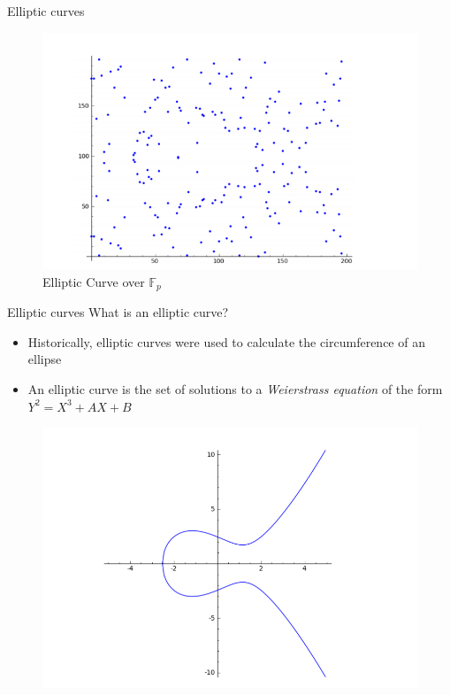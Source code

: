 \documentclass[handout]{beamer}
\begin{document}
\begin{frame}{Elliptic curves}
\begin{figure}
\begin{minipage}{0.48\textwidth}
		\caption{Elliptic Curve over $\mathbb{C}$}\label{fig:elliptic_curve_c}
	\end{minipage}\hfill
	\begin{minipage}{0.48\textwidth}
		\centering
		\includegraphics[width=.7\linewidth]{elliptic_curve_fp}
		\caption{Elliptic Curve over $\mathbb{F}_p$}\label{fig:elliptic_curve_fp]}
	\end{minipage}
\end{figure}

\end{frame}
\begin{frame}{Elliptic curves}
What is an elliptic curve?
\begin{itemize}[\textbullet]
	\item Historically, elliptic curves were used to calculate the circumference of an ellipse
	\item An elliptic curve is the set of solutions to a \textit{Weierstrass equation} of the form $Y^2=X^3+AX+B$
\end{itemize}

\begin{figure}
	\centering
	\includegraphics[width=.7\linewidth]{elliptic_curve}
	\label{fig:elliptic_curve}
\end{figure}
	
\end{frame}
\end{document}

